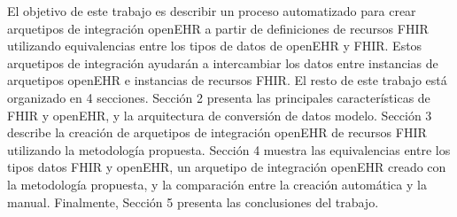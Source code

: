 El objetivo de este trabajo es describir un proceso automatizado para crear arquetipos de integración openEHR a partir de definiciones de recursos FHIR utilizando equivalencias entre los tipos de datos de openEHR y FHIR. Estos arquetipos de integración ayudarán a intercambiar los datos entre instancias de arquetipos openEHR e instancias de recursos FHIR. El resto de este trabajo está organizado en 4 secciones. Sección 2 presenta las principales características de FHIR y openEHR, y la arquitectura de conversión de datos modelo. Sección 3 describe la creación de arquetipos de integración openEHR de recursos FHIR utilizando la metodología propuesta. Sección 4 muestra las equivalencias entre los tipos datos FHIR y openEHR, un arquetipo de integración openEHR creado con la metodología propuesta, y la comparación entre la creación automática y la manual. Finalmente, Sección 5 presenta las conclusiones del trabajo.
